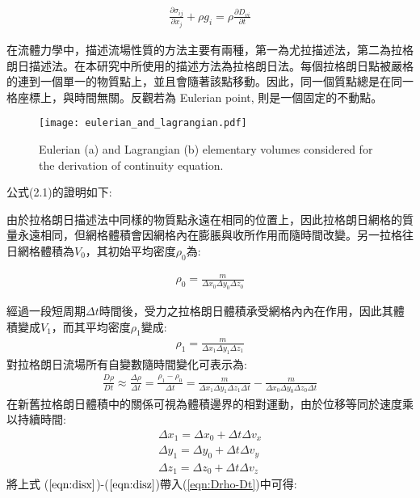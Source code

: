 \begin{align}
\frac{\partial \sigma_{ij}}{\partial x_j}+\rho g_i = \rho \frac{\partial D_{vi}}{\partial t} 
\end{align}

在流體力學中，描述流場性質的方法主要有兩種，第一為尤拉描述法，第二為拉格朗日描述法。在本研究中所使用的描述方法為拉格朗日法。每個拉格朗日點被嚴格的連到一個單一的物質點上，並且會隨著該點移動。因此，同一個質點總是在同一格座標上，與時間無關。反觀若為 Eulerian point, 則是一個固定的不動點。

\begin{figure*}[ht!]
    \centering
    \texttt{[image: eulerian\_and\_lagrangian.pdf]}
    \caption{ Eulerian (a) and Lagrangian (b) elementary volumes considered for the derivation of continuity equation. }
    \label{fig::Lagrangian Volume}
\end{figure*}

公式(2.1)的證明如下:

由於拉格朗日描述法中同樣的物質點永遠在相同的位置上，因此拉格朗日網格的質量永遠相同，但網格體積會因網格內在膨脹與收所作用而隨時間改變。另一拉格往日網格體積為$V_0$，其初始平均密度$\rho_0$為:

\begin{align}
\rho_0 = \frac{m}{\Delta x_0 \Delta y_0 \Delta z_0}
\end{align}

經過一段短周期$\Delta t$時間後，受力之拉格朗日體積承受網格內內在作用，因此其體積變成$V_1$，而其平均密度$\rho_1$變成:
\begin{align}
\rho_1 = \frac{m}{\Delta x_1 \Delta y_1 \Delta z_1}
\end{align}
對拉格朗日流場所有自變數隨時間變化可表示為:
\begin{align}
\frac{D\rho}{Dt} \approx \frac{\Delta \rho}{\Delta t} = \frac{\rho_1-\rho_0}{\Delta t}=\frac{m}{\Delta x_1 \Delta y_1 \Delta z_1\Delta t}-\frac{m}{\Delta x_0 \Delta y_0 \Delta z_0\Delta t}\label{eqn:Drho-Dt}
\end{align}
在新舊拉格朗日體積中的關係可視為體積邊界的相對運動，由於位移等同於速度乘以持續時間:
\begin{align}
\Delta x_1 = \Delta x_0+\Delta t\Delta v_x\label{eqn:disx}\\ 
\Delta y_1 = \Delta y_0+\Delta t\Delta v_y\label{eqn:disy}\\
\Delta z_1 = \Delta z_0+\Delta t\Delta v_z\label{eqn:disz}
\end{align}
將上式 ($\ref{eqn:disx}$)-($\ref{eqn:disz}$)帶入(\ref{eqn:Drho-Dt})中可得:

